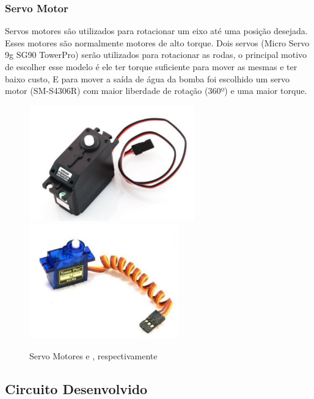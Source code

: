 \subsubsection{Servo Motor}
Servos motores são utilizados para rotacionar um eixo até uma posição desejada. Esses motores são normalmente motores de alto torque. Dois servos (Micro Servo 9g SG90 TowerPro) serão utilizados para rotacionar as rodas, o principal motivo de escolher esse modelo é ele ter torque suficiente para mover as mesmas e ter baixo custo, E para mover a saída de água da bomba foi escolhido um servo motor (SM-S4306R) com maior liberdade de rotação (360º) e uma maior torque.
\begin{figure}[h]
  \centering
	\includegraphics[height=5cm]{figures/servant-motor.png}
	\quad
	\includegraphics[height=5cm]{figures/micro-motor.png}
  \caption{Servo Motores \cite{flipflop2013} e \cite{flipflop2016}, respectivamente}
\end{figure}
\FloatBarrier

\subsection{Circuito Desenvolvido}
